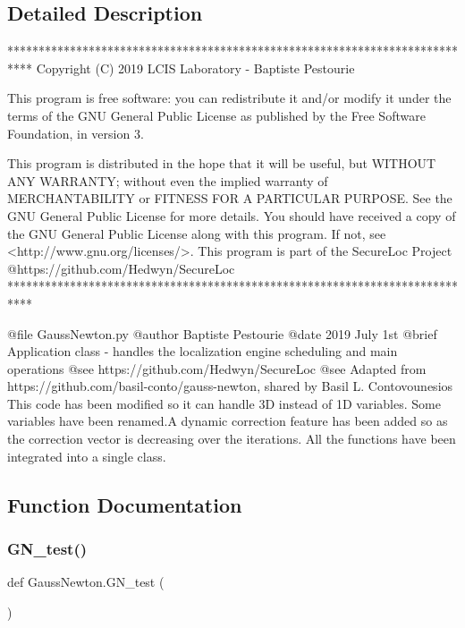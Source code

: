 \subsection{Detailed Description}
\begin{DoxyVerb}****************************************************************************
Copyright (C) 2019 LCIS Laboratory - Baptiste Pestourie

This program is free software: you can redistribute it and/or modify
it under the terms of the GNU General Public License as published by
the Free Software Foundation, in version 3.

This program is distributed in the hope that it will be useful,
but WITHOUT ANY WARRANTY; without even the implied warranty of
MERCHANTABILITY or FITNESS FOR A PARTICULAR PURPOSE. See the
GNU General Public License for more details.
You should have received a copy of the GNU General Public License
along with this program. If not, see <http://www.gnu.org/licenses/>.
This program is part of the SecureLoc Project @https://github.com/Hedwyn/SecureLoc
 ****************************************************************************

@file GaussNewton.py
@author Baptiste Pestourie
@date 2019 July 1st
@brief Application class - handles the localization engine scheduling and main operations
@see https://github.com/Hedwyn/SecureLoc
@see Adapted from https://github.com/basil-conto/gauss-newton,
shared by Basil L. Contovounesios
This code has been modified so it can handle 3D instead of 1D variables.
Some variables have been renamed.A dynamic correction feature has been added so as the correction vector is decreasing over the iterations.
All the functions have been integrated into a single class.
\end{DoxyVerb}
 

\subsection{Function Documentation}
\mbox{\label{namespace_gauss_newton_a11c318bc24f03725e9bc293ef30829bc}} 
\subsubsection{\texorpdfstring{G\+N\+\_\+test()}{GN\_test()}}
{\footnotesize\ttfamily def Gauss\+Newton.\+G\+N\+\_\+test (\begin{DoxyParamCaption}{ }\end{DoxyParamCaption})}

